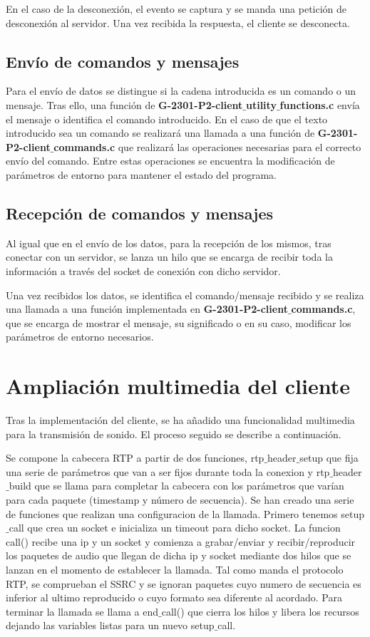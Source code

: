 \documentclass{mathnotes}
\begin{document}
En el caso de la desconexión, el evento se captura y se manda una petición de desconexión al servidor. Una vez recibida la respuesta, el cliente se desconecta.

\subsection{Envío de comandos y mensajes}
Para el envío de datos se distingue si la cadena introducida es un comando o un mensaje.
Tras ello, una función de \textbf{G-2301-P2-client$\_$utility$\_$functions.c} envía el mensaje o identifica el comando introducido. En el caso de que el texto introducido sea un comando se realizará una llamada a una función de \textbf{G-2301-P2-client$\_$commands.c} que realizará las operaciones necesarias para el correcto envío del comando. Entre estas operaciones se encuentra la modificación de parámetros de entorno para mantener el estado del programa.

\subsection{Recepción de comandos y mensajes}
Al igual que en el envío de los datos, para la recepción de los mismos, tras conectar con un servidor, se lanza un hilo que se encarga de recibir toda la información a través del socket de conexión con dicho servidor.

Una vez recibidos los datos, se identifica el comando/mensaje recibido y se realiza una llamada a una función implementada en \textbf{G-2301-P2-client$\_$commands.c}, que se encarga de mostrar el mensaje, su significado o en su caso, modificar los parámetros de entorno necesarios.

\section{Ampliación multimedia del cliente}

Tras la implementación del cliente, se ha añadido una funcionalidad multimedia para la transmisión de sonido. El proceso seguido se describe a continuación.

Se compone la cabecera RTP a partir de dos funciones, rtp$\_$header$\_$setup que fija una serie de parámetros que van a ser fijos durante toda la conexion y rtp$\_$header$\_$build que se llama para completar la cabecera con los parámetros que varían para cada paquete (timestamp y número de secuencia).
Se han creado una serie de funciones que realizan una configuracion de la llamada.
Primero tenemos setup$\_$call que crea un socket e inicializa un timeout para dicho socket.
La funcion call() recibe una ip y un socket y comienza a grabar/enviar y recibir/reproducir los paquetes de audio que llegan de dicha ip y socket mediante dos hilos que se lanzan en el momento de establecer la llamada.
Tal como manda el protocolo RTP, se comprueban el SSRC y se ignoran paquetes cuyo numero de secuencia es inferior al ultimo reproducido o cuyo formato sea diferente al acordado.
Para terminar la llamada se llama a end$\_$call() que cierra los  hilos y libera los recursos dejando las variables listas para  un nuevo setup$\_$call.
\end{document}
